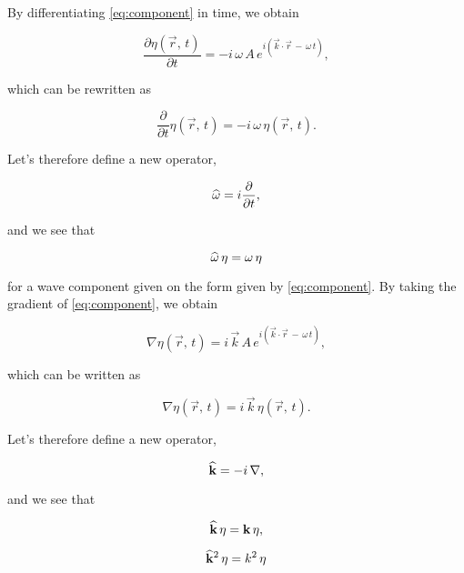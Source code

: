 By differentiating \ref{eq:component} in time, we obtain

\begin{equation}
\frac{\partial\eta(\vec{r},\,t)}{\partial t} = -i\,\omega\,A\,e^{i(\vec{k}\cdot\vec{r}\,-\,\omega\,t)},
\end{equation}

which can be rewritten as

\begin{equation}
\frac{\partial}{\partial t}\eta(\vec{r},\,t) = -i\,\omega\,\eta(\vec{r},\,t).
\end{equation}

Let's therefore define a new operator,

\begin{equation} \label{eq:opomega}
\widehat{\omega} = i\frac{\partial}{\partial t},
\end{equation}

and we see that

\begin{equation} \label{eq:opomegaaction}
\widehat{\omega}\,\eta = \omega\,\eta
\end{equation}

for a wave component given on the form given by \ref{eq:component}. By taking the gradient of \ref{eq:component}, we obtain

\begin{equation}
\nabla\eta(\vec{r},\,t) = i\,\vec{k}\,A\,e^{i(\vec{k}\cdot\vec{r}\,-\,\omega\,t)},
\end{equation}

which can be written as

\begin{equation}
\nabla\eta(\vec{r},\,t) = i\,\vec{k}\,\eta(\vec{r},\,t).
\end{equation}

Let's therefore define a new operator,

\begin{equation} \label{eq:opkvec}
\widehat{\mathbf{\mathbf{k}}} = -i\,\nabla,
\end{equation}

and we see that 

\begin{equation} \label{eq:opkvec1action}
\widehat{\mathbf{k}}\,\eta = \mathbf{k}\,\eta,
\end{equation}

\begin{equation} \label{eq:opkvec2action}
{\widehat{\mathbf{k}}}^2\,\eta = k^2\,\eta
\end{equation}

